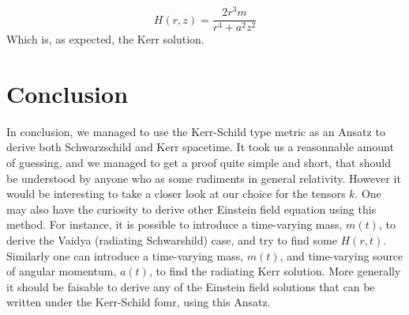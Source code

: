 \documentclass[a4paper,12pt]{article}
\theoremstyle{definition}
\begin{document}
\begin{equation}
	H(r,z)=\frac{2r^3m}{r^4+a^2z^2}
\end{equation}
Which is, as expected, the Kerr solution.

\section{Conclusion}
In conclusion, we managed to use the Kerr-Schild type metric as an Ansatz to derive both Schwarzschild and Kerr spacetime.
It took us a reasonnable amount of guessing, and we managed to get a proof quite simple and short, that should be understood by anyone who as some rudiments in general relativity.
However it would be interesting to take a closer look at our choice for the tensors $k$.
One may also have the curiosity to derive other Einstein field equation using this method.
For instance, it is possible to introduce a time-varying mass, $m(t)$, to derive the Vaidya (radiating Schwarshild) case, and try to find some $H(r,t)$.
Similarly one can introduce a time-varying mass, $m(t)$, and time-varying source of angular momentum, $a(t)$, to find the radiating Kerr solution.
More generally it should be faisable to derive any of the Einstein field solutions that can be written under the Kerr-Schild fomr, using this Ansatz.
\end{document}
